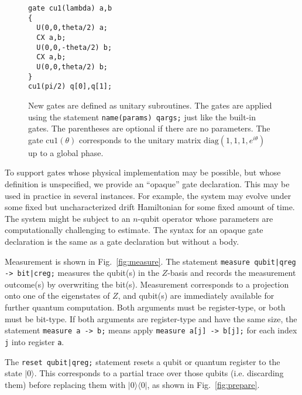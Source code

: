 \documentclass[USenglish,12pt,fleqn]{article} %
\newcommand*{\code}{\texttt}
\begin{document}
\begin{figure}
\hspace{.1\textwidth}
\begin{minipage}{.4\textwidth}

\end{minipage}

\hspace{.3\textwidth}
\begin{minipage}{.3\textwidth}
\begin{verbatim}
gate cu1(lambda) a,b
{
  U(0,0,theta/2) a;
  CX a,b;
  U(0,0,-theta/2) b;
  CX a,b;
  U(0,0,theta/2) b;
}
cu1(pi/2) q[0],q[1];
\end{verbatim}
\end{minipage}

\caption{New gates are defined as unitary subroutines. The gates are applied using the statement \code{name(params) qargs;} just like the built-in gates. The parentheses are optional if there are no parameters. The gate $\mathrm{cu1}(\theta)$ corresponds to the unitary matrix $\mathrm{diag}(1,1,1,e^{i\theta})$ up to a global phase.
\label{fig:gate}}
\end{figure}

To support gates whose physical implementation may be possible, but whose definition is unspecified, we provide an ``opaque'' gate declaration. This may be used in practice in several instances. For example, the system may evolve under some fixed but uncharacterized drift Hamiltonian for some fixed amount of time. The system might be subject to an $n$-qubit operator whose parameters are computationally challenging to estimate. The syntax for an opaque gate declaration is the same as a gate declaration but without a body.

Measurement is shown in Fig.~\ref{fig:measure}. The statement \code{measure qubit|qreg -> bit|creg;} measures the qubit(s) in the $Z$-basis and records the measurement outcome(s) by overwriting the bit(s). Measurement corresponds to a projection onto one of the eigenstates of $Z$, and qubit(s) are immediately available for further quantum computation. Both arguments must be register-type, or both must be bit-type. If both arguments are register-type and have the same size, the statement \code{measure a -> b;} means apply \code{measure a[j] -> b[j];} for each index \code{j} into register \code{a}.

The \code{reset qubit|qreg;} statement resets a qubit or quantum register to the state $|0\rangle$. This corresponds to a partial trace over those qubits (i.e. discarding them) before replacing them with $|0\rangle\langle 0|$, as shown in Fig.~\ref{fig:prepare}.
\end{document}
